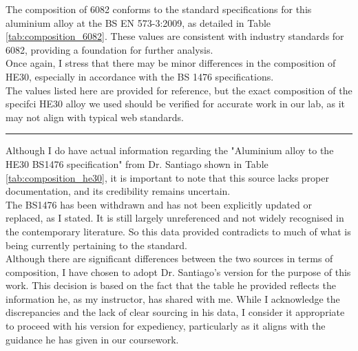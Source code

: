 \documentclass{article}
\begin{document}
\begin{minipage}{0.53\textwidth}
    The composition of 6082 conforms to the standard specifications for this aluminium alloy at the BS EN 573-3:2009, as detailed in Table \ref{tab:composition_6082}. These values are consistent with industry standards for 6082, providing a foundation for further analysis.\\[8pt]
    Once again, I stress that there may be minor differences in the composition of HE30, especially in accordance with the BS 1476 specifications.\\[8pt] 
    The values listed here are provided for reference, but the exact composition of the specifci HE30 alloy we used should be verified for accurate work in our lab, as it may not align with typical web standards.
    \vspace{1em}\hrule\vspace{1em}
    Although I do have actual information regarding the "Aluminium alloy to the HE30 BS1476 specification" from Dr. Santiago shown in Table \ref{tab:composition_he30}, it is important to note that this source lacks proper documentation, and its credibility remains uncertain.\\[8pt]
    The BS1476 has been withdrawn and has not been explicitly updated or replaced, as I stated. It is still largely unreferenced and not widely recognised in the contemporary literature. So this data provided contradicts to much of what is being currently pertaining to the standard.\\[8pt]
    Although there are significant differences between the two sources in terms of composition, I have chosen to adopt Dr. Santiago's version for the purpose of this work. This decision is based on the fact that the table he provided reflects the information he, as my instructor, has shared with me. While I acknowledge the discrepancies and the lack of clear sourcing in his data, I consider it appropriate to proceed with his version for expediency, particularly as it aligns with the guidance he has given in our coursework.
\end{minipage}\\

\raggedright
\end{document}
